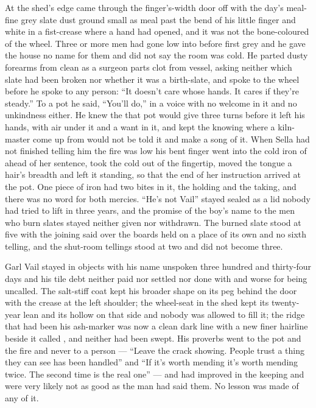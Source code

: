 At the shed's edge  came through the finger's-width door off  with the day's meal-fine grey slate dust ground small as meal past the bend of his little finger and white in a fist-crease where a hand had opened, and it was not the bone-coloured  of the wheel. Three or more men had gone low into  before first grey and he gave the house no name for them and did not say the room was cold. He parted dusty forearms from clean as a surgeon parts clot from vessel, asking neither which slate had been broken nor whether it was a birth-slate, and spoke to the wheel before he spoke to any person: “It doesn't care whose hands. It cares if they're steady.” To a pot he said, “You'll do,” in a voice with no welcome in it and no unkindness either. He knew the  that pot would give three turns before it left his hands, with air under it and a want in it, and kept the knowing where a kiln-master come up from  would not be told it and make a song of it. When Sella had not finished telling him the fire was low his bent finger went into the cold iron of  ahead of her sentence, took the cold out of the fingertip, moved the tongue a hair's breadth and left it standing, so that the end of her instruction arrived at the pot. One piece of iron had two bites in it, the holding and the taking, and there was no  word for both mercies. “He's not Vail” stayed sealed as a lid nobody had tried to lift in three years, and the promise of the boy's name to the men who burn slates stayed neither given nor withdrawn. The burned slate stood at five with the joining said over the boards held on a place of its own and no sixth telling, and the shut-room tellings stood at two and did not become three.

Garl Vail stayed in objects with his name unspoken three hundred and thirty-four days and his tile debt neither paid nor settled nor done with and worse for being uncalled. The salt-stiff coat kept his broader shape on its peg behind the door with the crease at the left shoulder; the wheel-seat in the shed kept its twenty-year lean and its hollow on that side and nobody was allowed to fill it; the ridge that had been his ash-marker was now a clean dark line with a new finer hairline beside it called , and neither had been swept. His proverbs went to the pot and the fire and never to a person --- “Leave the crack showing. People trust a thing they can see has been handled” and “If it's worth mending it's worth mending twice. The second time is the real one” --- and had improved in the keeping and were very likely not as good as the man had said them. No lesson was made of any of it.

